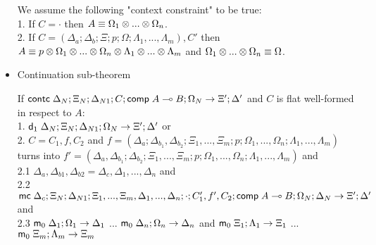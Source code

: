 \begin{itemize}
We assume the following "context constraint" to be true:\\

1. If $C = \cdot$ then $A \equiv \Omega_1 \otimes ... \otimes \Omega_n$.\\
2. If $C = (\Delta_a; \Delta_b; \Xi; p; \Omega; \Lambda_1, ..., \Lambda_m), C'$ then $A \equiv p \otimes \Omega_1 \otimes ... \otimes \Omega_n \otimes \Lambda_1 \otimes ... \otimes \Lambda_m$ and $\Omega_1 \otimes ... \otimes \Omega_n \equiv \Omega$.

\item Continuation sub-theorem

If $\mathsf{contc} \; \Delta_N; \Xi_N; \Delta_{N1}; C; \mathsf{comp} \; A \multimap B; \Omega_N \rightarrow \Xi'; \Delta'$ and $C$ is flat well-formed in respect to $A$: \\
1. \hspace{1cm} $\mathsf{d}_1 \; \Delta_N; \Xi_N; \Delta_{N1}; \Omega_N \rightarrow \Xi'; \Delta'$ or \\
2. \hspace{1cm} $C = C_1, f, C_2$ and $f = (\Delta_a; \Delta_{b_1}, \Delta_{b_2}; \Xi_1, ..., \Xi_m; p; \Omega_1, ..., \Omega_n; \Lambda_1, ..., \Lambda_m)$ turns into $f' = (\Delta_a, \Delta_{b_1}; \Delta_{b_2}; \Xi_1, ..., \Xi_m; p; \Omega_1, ..., \Omega_n; \Lambda_1, ..., \Lambda_m)$ and\\
2.1 \hspace{2cm} $\Delta_a, \Delta_{b1}, \Delta_{b2} = \Delta_c, \Delta_1, ..., \Delta_n$ and \\
2.2 \hspace{2cm} $\mathsf{mc} \; \Delta_c; \Xi_N; \Delta_{N1}; \Xi_1, ..., \Xi_m, \Delta_1, ..., \Delta_n; \cdot; C'_1, f', C_2; \mathsf{comp} \; A \multimap B; \Omega_N; \Delta_N \rightarrow \Xi'; \Delta'$ and \\
2.3 \hspace{2cm} $\mathsf{m}_0 \; \Delta_1; \Omega_1 \rightarrow \Delta_1$ ... $\mathsf{m}_0 \; \Delta_n; \Omega_n \rightarrow \Delta_n$ and $\mathsf{m}_0 \; \Xi_1; \Lambda_1 \rightarrow \Xi_1$ ... $\mathsf{m}_0 \; \Xi_m; \Lambda_m \rightarrow \Xi_m$\\

\end{itemize}

